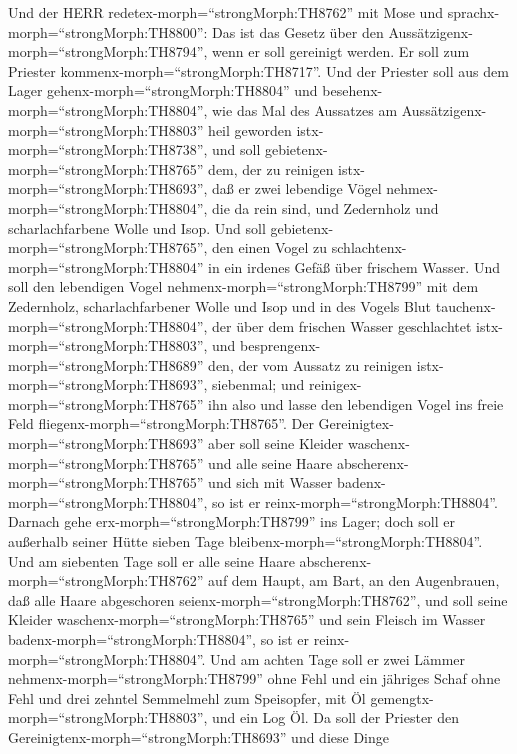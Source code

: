  Und der HERR redetex-morph=``strongMorph:TH8762'' mit Mose
und sprachx-morph=``strongMorph:TH8800'':  Das ist das
Gesetz über den Aussätzigenx-morph=``strongMorph:TH8794'', wenn er soll
gereinigt werden. Er soll zum Priester
kommenx-morph=``strongMorph:TH8717''.  Und der Priester soll
aus dem Lager gehenx-morph=``strongMorph:TH8804'' und
besehenx-morph=``strongMorph:TH8804'', wie das Mal des Aussatzes am
Aussätzigenx-morph=``strongMorph:TH8803'' heil geworden
istx-morph=``strongMorph:TH8738'',  und soll
gebietenx-morph=``strongMorph:TH8765'' dem, der zu reinigen
istx-morph=``strongMorph:TH8693'', daß er zwei lebendige Vögel
nehmex-morph=``strongMorph:TH8804'', die da rein sind, und Zedernholz
und scharlachfarbene Wolle und Isop.  Und soll
gebietenx-morph=``strongMorph:TH8765'', den einen Vogel zu
schlachtenx-morph=``strongMorph:TH8804'' in ein irdenes Gefäß über
frischem Wasser.  Und soll den lebendigen Vogel
nehmenx-morph=``strongMorph:TH8799'' mit dem Zedernholz,
scharlachfarbener Wolle und Isop und in des Vogels Blut
tauchenx-morph=``strongMorph:TH8804'', der über dem frischen Wasser
geschlachtet istx-morph=``strongMorph:TH8803'',  und
besprengenx-morph=``strongMorph:TH8689'' den, der vom Aussatz zu
reinigen istx-morph=``strongMorph:TH8693'', siebenmal; und
reinigex-morph=``strongMorph:TH8765'' ihn also und lasse den lebendigen
Vogel ins freie Feld fliegenx-morph=``strongMorph:TH8765''. 
Der Gereinigtex-morph=``strongMorph:TH8693'' aber soll seine Kleider
waschenx-morph=``strongMorph:TH8765'' und alle seine Haare
abscherenx-morph=``strongMorph:TH8765'' und sich mit Wasser
badenx-morph=``strongMorph:TH8804'', so ist er
reinx-morph=``strongMorph:TH8804''. Darnach gehe
erx-morph=``strongMorph:TH8799'' ins Lager; doch soll er außerhalb
seiner Hütte sieben Tage bleibenx-morph=``strongMorph:TH8804''.
 Und am siebenten Tage soll er alle seine Haare
abscherenx-morph=``strongMorph:TH8762'' auf dem Haupt, am Bart, an den
Augenbrauen, daß alle Haare abgeschoren
seienx-morph=``strongMorph:TH8762'', und soll seine Kleider
waschenx-morph=``strongMorph:TH8765'' und sein Fleisch im Wasser
badenx-morph=``strongMorph:TH8804'', so ist er
reinx-morph=``strongMorph:TH8804''.  Und am achten Tage
soll er zwei Lämmer nehmenx-morph=``strongMorph:TH8799'' ohne Fehl und
ein jähriges Schaf ohne Fehl und drei zehntel Semmelmehl zum Speisopfer,
mit Öl gemengtx-morph=``strongMorph:TH8803'', und ein Log Öl.
 Da soll der Priester den
Gereinigtenx-morph=``strongMorph:TH8693'' und diese Dinge
